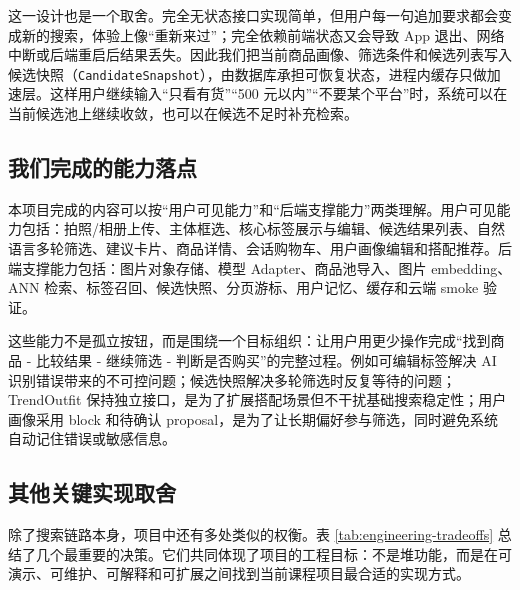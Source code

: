 \documentclass[UTF8,a4paper,zihao=-4]{ctexart}
\newcommand{\code}[1]{\texttt{\small #1}}
\begin{document}
这一设计也是一个取舍。完全无状态接口实现简单，但用户每一句追加要求都会变成新的搜索，体验上像“重新来过”；完全依赖前端状态又会导致 App 退出、网络中断或后端重启后结果丢失。因此我们把当前商品画像、筛选条件和候选列表写入候选快照（\mbox{\code{CandidateSnapshot}}），由数据库承担可恢复状态，进程内缓存只做加速层。这样用户继续输入“只看有货”“500 元以内”“不要某个平台”时，系统可以在当前候选池上继续收敛，也可以在候选不足时补充检索。

\subsection{我们完成的能力落点}

本项目完成的内容可以按“用户可见能力”和“后端支撑能力”两类理解。用户可见能力包括：拍照/相册上传、主体框选、核心标签展示与编辑、候选结果列表、自然语言多轮筛选、建议卡片、商品详情、会话购物车、用户画像编辑和搭配推荐。后端支撑能力包括：图片对象存储、模型 Adapter、商品池导入、图片 embedding、ANN 检索、标签召回、候选快照、分页游标、用户记忆、缓存和云端 smoke 验证。

这些能力不是孤立按钮，而是围绕一个目标组织：让用户用更少操作完成“找到商品 - 比较结果 - 继续筛选 - 判断是否购买”的完整过程。例如可编辑标签解决 AI 识别错误带来的不可控问题；候选快照解决多轮筛选时反复等待的问题；TrendOutfit 保持独立接口，是为了扩展搭配场景但不干扰基础搜索稳定性；用户画像采用 block 和待确认 proposal，是为了让长期偏好参与筛选，同时避免系统自动记住错误或敏感信息。

\subsection{其他关键实现取舍}

除了搜索链路本身，项目中还有多处类似的权衡。表 \ref{tab:engineering-tradeoffs} 总结了几个最重要的决策。它们共同体现了项目的工程目标：不是堆功能，而是在可演示、可维护、可解释和可扩展之间找到当前课程项目最合适的实现方式。
\end{document}
